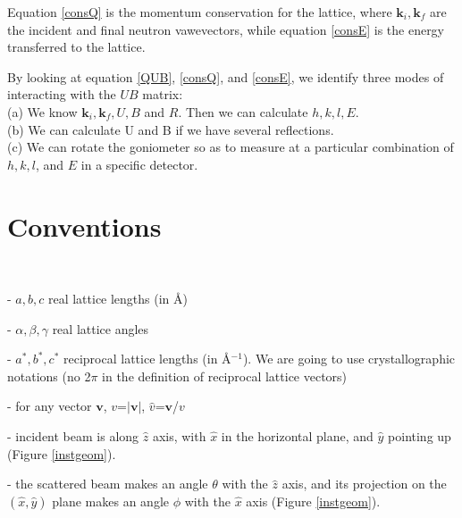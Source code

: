 \documentclass[prb]{revtex4}%
\begin{document}
Equation \ref{consQ} is the momentum conservation for the lattice, where $\textbf{k}_i, \textbf{k}_f$ are the
incident and final neutron vawevectors, while equation \ref{consE} is the energy transferred to the lattice.

By looking at equation \ref{QUB}, \ref{consQ}, and \ref{consE}, we identify three modes of interacting with the $UB$ matrix:\\
\hspace*{0.25 in} (a) We know $\textbf{k}_i, \textbf{k}_f, U, B$ and $R$. Then we can calculate $h, k, l, E$.\\
\hspace*{0.25 in} (b) We can calculate U and B if we have several reflections.\\
\hspace*{0.25 in} (c) We can rotate the goniometer so as to measure at a particular combination of $h, k, l$, and $E$ in a specific detector.

\section{Conventions}

\

- $a, b, c$ real lattice lengths (in \AA)

- $\alpha, \beta, \gamma$ real lattice angles

- $a^*, b^*, c^*$ reciprocal lattice lengths (in \AA$^{-1}$). We are going to use crystallographic notations (no 2$\pi$ in the definition of reciprocal lattice vectors)

- for any vector $\textbf{v}$, $v$=$|\textbf{v}|$, $\widehat{v}$=$\textbf{v}$/$v$

- incident beam is along $\widehat{z}$ axis, with $\widehat{x}$ in the horizontal plane, and $\widehat{y}$ pointing up (Figure \ref{instgeom}).

- the scattered beam makes an angle $\theta$ with the $\widehat{z}$ axis, and its projection on the  $(\widehat{x},\widehat{y})$ plane
makes an angle $\phi$ with the $\widehat{x}$ axis (Figure \ref{instgeom}).
\end{document}
